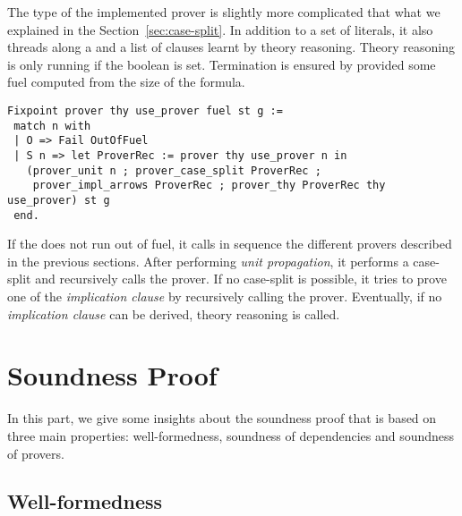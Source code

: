 \documentclass[utf8,a4paper,UKenglish,cleveref, autoref, thm-restate]{lipics-v2019}
\begin{document}
The type of the implemented prover is slightly more complicated that what we explained in the Section~\ref{sec:case-split}.
In addition to a set of literals, it also threads along a  and a list of clauses learnt by theory reasoning.
Theory reasoning is only running if the boolean  is set.
%
Termination is ensured by provided some fuel computed from the size of the formula. 
\begin{verbatim}
Fixpoint prover thy use_prover fuel st g :=
 match n with
 | O => Fail OutOfFuel
 | S n => let ProverRec := prover thy use_prover n in
   (prover_unit n ; prover_case_split ProverRec ;
    prover_impl_arrows ProverRec ; prover_thy ProverRec thy use_prover) st g
 end.
\end{verbatim}
If the  does not run out of fuel, it calls in sequence
the different provers described in the previous sections.  After
performing \emph{unit propagation}, it performs a case-split and
recursively calls the prover. If no case-split is possible, it tries
to prove one of the \emph{implication clause} by recursively calling
the prover. Eventually, if no \emph{implication clause} can be
derived, theory reasoning is called.

\section{Soundness Proof}
\label{sec:soundness-proof}
In this part, we give some insights about the soundness proof that is
based on three main properties: well-formedness, soundness of
dependencies and soundness of provers.

\subsection{Well-formedness}
\end{document}
